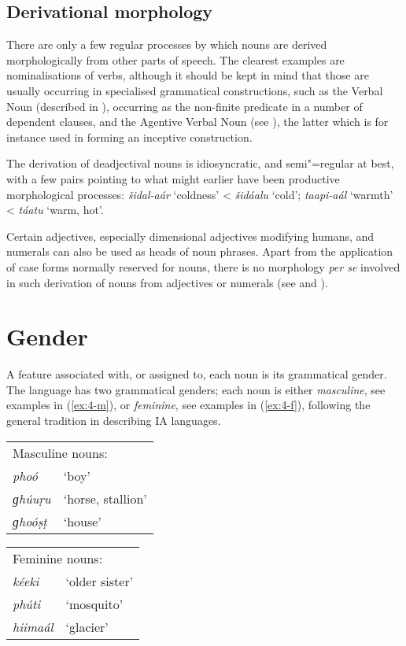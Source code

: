 \subsection{Derivational morphology}
\label{subsec:4-2-2}

There are only a few regular processes by which nouns are derived morphologically from other parts of speech. The clearest examples are nominalisations of verbs, although it should be kept in mind that those are usually occurring in specialised grammatical constructions, such as the Verbal Noun (described in ), occurring as the non-finite predicate in a number of dependent clauses, and the Agentive Verbal Noun (see ), the latter which is for instance used in forming an inceptive construction.


The derivation of deadjectival nouns is idiosyncratic, and semi"=regular at best, with a few pairs pointing to what might earlier have been productive morphological processes: \textit{šidal-aár} `coldness' < \textit{šidáalu} `cold'; \textit{taapi-aál} `warmth' < \textit{táatu} `warm, hot'.     


Certain adjectives, especially dimensional adjectives modifying humans, and numerals can also be used as heads of noun phrases. Apart from the application of case forms normally reserved for nouns, there is no morphology \textit{per se} involved in such derivation of nouns from adjectives or numerals (see  and ). 


\section{Gender}
\label{sec:4-3}

A feature associated with, or assigned to, each noun is its grammatical gender. The language has two grammatical genders; each noun is either \textit{masculine}, see examples in (\ref{ex:4-m}), or \textit{feminine}, see examples in (\ref{ex:4-f}), following the general tradition in describing IA languages. 


\begin{exe}
\extab
\label{ex:4-m}
\begin{tabularx}{\textwidth}{ l l }
\multicolumn{2}{l}{Masculine nouns:}\\
\textit{phoó} &
`boy' \\
\textit{ɡhúuṛu} &
`horse, stallion'\\
\textit{ɡhoóṣṭ} &
`house'\\
\end{tabularx}

\extab
\label{ex:4-f}
\begin{tabularx}{\textwidth}{ l l }
\multicolumn{2}{l}{Feminine nouns:}\\
\textit{kéeki} &
`older sister'\\
\textit{phúti} &
`mosquito'\\
\textit{hiimaál} &
`glacier'\\
\end{tabularx}
\end{exe}


